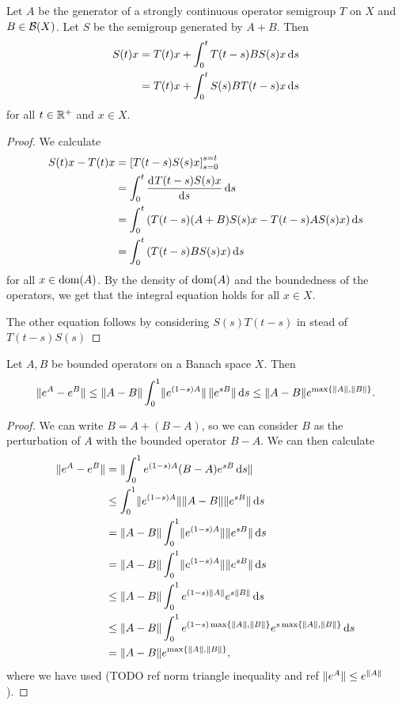 \begin{proposition} \label{operatorVariationOfParameteres}
Let $A$ be the generator of a strongly continuous operator semigroup $T$ on $X$ and $B\in\operatorname{\mathcal{B}}(X)$. Let $S$ be the semigroup generated by $A+B$. Then
\begin{align*}
S(t)x &= T(t)x + \int_0^tT(t-s)BS(s)x\operatorname{d \!}{s} \\
&= T(t)x + \int_0^tS(s)BT(t-s)x\operatorname{d \!}{s}
\end{align*}
for all $t\in\mathbb{R}^+$ and $x\in X$.
\end{proposition}
\begin{proof}
We calculate
\begin{align*}
S(t)x - T(t)x &= \left[ T(t-s)S(s)x \right]_{s=0}^{s=t} \\
&= \int_0^t \mathinner{ \dfrac{\operatorname{d \!}{^{}}T(t-s)S(s)x}{\operatorname{d \!}{{s}^{}}} }\operatorname{d \!}{s} \\
&= \int_0^t \left( T(t-s)(A+B)S(s)x - T(t-s)AS(s)x \right)\operatorname{d \!}{s} \\
&= \int_0^t \left( T(t-s)BS(s)x \right)\operatorname{d \!}{s}
\end{align*}
for all $x\in \operatorname{dom}(A)$. By the density of $\operatorname{dom}(A)$ and the boundedness of the operators, we get that the integral equation holds for all $x\in X$.

The other equation follows by considering $S(s)T(t-s)$ in stead of $T(t-s)S(s)$
\end{proof}
\begin{corollary}
Let $A,B$ be bounded operators on a Banach space $X$. Then
\[ \lVert e^{A} - e^{B}\rVert \leq \lVert A-B\rVert\int_0^1\lVert e^{(1-s)A}\rVert\,\lVert e^{sB}\rVert\operatorname{d \!}{s} \leq \lVert A-B\rVert e^{\max\{\lVert A\rVert, \lVert B\rVert\}}. \]
\end{corollary}
\begin{proof}
We can write $B = A + (B-A)$, so we can consider $B$ as the perturbation of $A$ with the bounded operator $B-A$. We can then calculate
\begin{align*}
\lVert e^A - e^B\rVert &= \lVert\int_0^1e^{(1-s)A}(B-A)e^{sB} \operatorname{d \!}{s}\rVert \\
&\leq \int_0^1\lVert e^{(1-s)A}\rVert\lVert A-B\rVert\lVert e^{sB}\rVert\operatorname{d \!}{s} \\
&= \lVert A-B\rVert \int_0^1\lVert e^{(1-s)A}\rVert\lVert e^{sB}\rVert\operatorname{d \!}{s} \\
&= \lVert A-B\rVert \int_0^1\lVert e^{(1-s)A}\rVert\lVert e^{sB}\rVert\operatorname{d \!}{s} \\
&\leq \lVert A-B\rVert \int_0^1e^{(1-s)\lVert A\rVert}e^{s\lVert B\rVert}\operatorname{d \!}{s} \\
&\leq \lVert A-B\rVert \int_0^1e^{(1-s)\max\{\lVert A\rVert, \lVert B\rVert\}}e^{s\max\{\lVert A\rVert, \lVert B\rVert\}}\operatorname{d \!}{s} \\
&= \lVert A-B\rVert e^{\max\{\lVert A\rVert, \lVert B\rVert\}},
\end{align*}
where we have used (TODO ref norm triangle inequality and ref $\lVert e^A\rVert \leq e^{\lVert A\rVert}$).
\end{proof}
